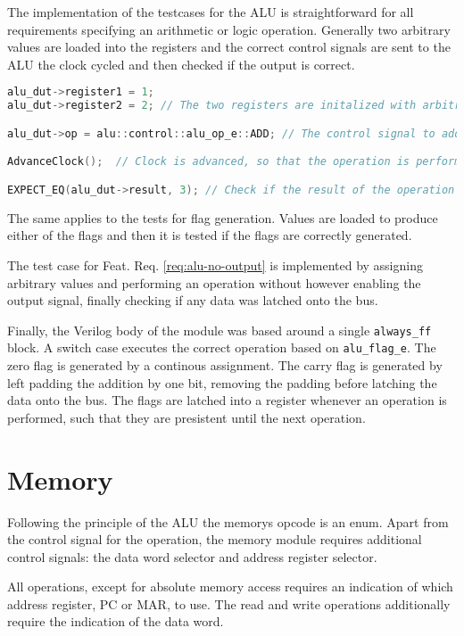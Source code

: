 The implementation of the testcases for the ALU is straightforward for all requirements specifying an arithmetic or logic operation. Generally two arbitrary values are loaded into the registers and the correct control signals are sent to the ALU the clock cycled and then checked if the output is correct. 


\begin{lstlisting}[language=c++]
alu_dut->register1 = 1; 
alu_dut->register2 = 2; // The two registers are initalized with arbitrary values

alu_dut->op = alu::control::alu_op_e::ADD; // The control signal to add the two registers is set 

AdvanceClock();  // Clock is advanced, so that the operation is performed

EXPECT_EQ(alu_dut->result, 3); // Check if the result of the operation is correct.
\end{lstlisting}

The same applies to the tests for flag generation. Values are loaded to produce either of the flags and then it is tested if the flags are correctly generated.

The test case for Feat. Req. \ref{req:alu-no-output} is implemented by assigning arbitrary values and performing an operation without however enabling the output signal, finally checking if any data was latched onto the bus.  

Finally, the Verilog body of the module was based around a single \texttt{always\_ff} block. A switch case executes the correct operation based on \texttt{alu\_flag\_e}. The zero flag is generated by a continous assignment. The carry flag is generated by left padding the addition by one bit, removing the padding before latching the data onto the bus. The flags are latched into a register whenever an operation is performed, such that they are presistent until the next operation.

\section{Memory}

Following the principle of the ALU the memorys opcode is an enum. Apart from the control signal for the operation, the memory module requires additional control signals: the data word selector and address register selector.

All operations, except for absolute memory access requires an indication of which address register, PC or MAR, to use. The read and write operations additionally require the indication of the data word. 

